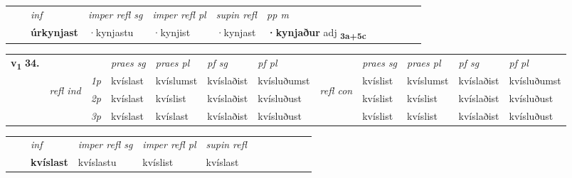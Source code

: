 \begin{tabular}{llllllllllll}
 & & \textit{inf}   & \textit{imper refl sg} & \textit{imper refl pl}   & \textit{supin refl} & \textit{pp m}     \\*
  & & \textbf{úrkynjast}    & ·kynjastu & ·kynjist   & ·kynjast & \textbf{·kynjaður} adj \textbf{\textsubscript{3a+5c}} \\*
\cmidrule{1-12}
\end{tabular}



\begin{tabular}{llllllllllll} \toprule
\multirow{4}{*}{{{\textbf{v{\textsubscript{1}}} \Large{\textbf{34.}}}}}  & &   &  \textit{praes sg}  & \textit{praes pl}  &\textit{pf sg} & \textit{pf pl} &  &  \textit{praes sg}  & \textit{praes pl}  & \textit{pf sg} & \textit{pf pl } \\*
	\cmidrule{4-7} \cmidrule{9-12}
 &\multirow{3}{*}{\begin{turn}{90}\textit{refl ind}\end{turn}} & {\textit{1p}} & kvíslast & kvíslumst    & kvíslaðist & kvísluðumst & \multirow{3}{*}{\begin{turn}{90}\textit{refl con}\end{turn}}  &kvíslist & kvíslumst & kvíslaðist & kvísluðumst\\*
 &&  {\textit{2p}} &  kvíslast  & kvíslist   & kvíslaðist & kvísluðust & &kvíslist & kvíslist & kvíslaðist & kvísluðust \\*
& &  {\textit{3p}} & kvíslast & kvíslast   & kvíslaðist & kvísluðust & & kvíslist & kvíslist& kvíslaðist & kvísluðust  \\*
\cmidrule{4-7} \cmidrule{9-12}
\end{tabular}


\begin{tabular}{llllllllllll}
 & & \textit{inf}   & \textit{imper refl sg} & \textit{imper refl pl}   & \textit{supin refl}      \\*
  & & \textbf{kvíslast}    & kvíslastu & kvíslist   & kvíslast  \\*
\cmidrule{1-12}
\end{tabular}




